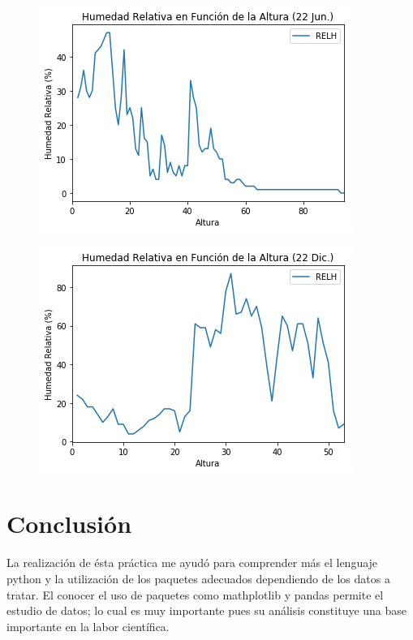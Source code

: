\documentclass{article}
\begin{document}
     \begin{figure}[H]
        \centering
        \includegraphics[width=\linewidth]{hj.png}
    \end{figure}
     \begin{figure}[H]
        \centering
        \includegraphics[width=\linewidth]{hd.png}
    \end{figure}
    
\section{Conclusión}
La realización de ésta práctica me ayudó para comprender más el lenguaje python y la utilización de los paquetes adecuados dependiendo de los datos a tratar. El conocer el uso de paquetes como mathplotlib y pandas permite el estudio de datos; lo cual es muy importante pues su análisis constituye una base importante en la labor científica. 
\end{document}
